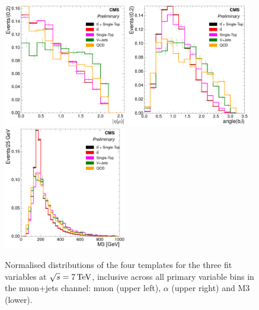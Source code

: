 \begin{figure}[hbtp]
    \centering
     \includegraphics[width=0.48\textwidth]{Chapters/04_Analysis/04b_XSections/images/7TeV/fit_variables/muon/MET/muon_absolute_eta/MET_inclusive_muon_absolute_eta_2orMoreBtags_templates.pdf}\hfill
	 \includegraphics[width=0.48\textwidth]{Chapters/04_Analysis/04b_XSections/images/7TeV/fit_variables/muon/MET/angle_bl/MET_inclusive_angle_bl_2orMoreBtags_templates.pdf}\\
	 \includegraphics[width=0.48\textwidth]{Chapters/04_Analysis/04b_XSections/images/7TeV/fit_variables/muon/MET/M3/MET_inclusive_M3_2orMoreBtags_templates.pdf}\\
	 \caption{Normalised distributions of the four templates for the three fit variables at $\sqrt{s}=7\,\text{Te\hspace{-.08em}V}$,
	 inclusive across all primary variable bins in the muon+jets channel: muon \abseta (upper left),
	 $\alpha$ (upper right) and M3 (lower).}
     \label{fig:fit_variable_distributions_muon_7TeV}
\end{figure}

